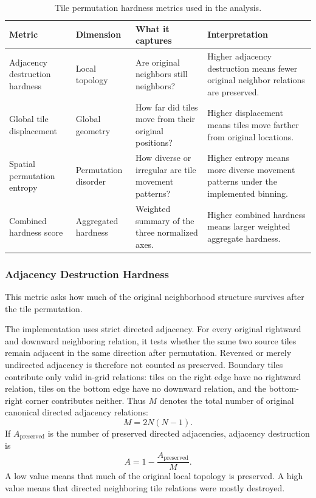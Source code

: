 \documentclass[12pt]{article}
\newcommand{\reporttablesize}{\small}
\begin{document}
\begin{table}[t]
  \centering
  \reporttablesize
  \renewcommand{\arraystretch}{1.12}
  \begin{tabularx}{\textwidth}{>{\raggedright\arraybackslash}p{}>{\raggedright\arraybackslash}p{}>{\raggedright\arraybackslash}p{}>{\raggedright\arraybackslash}X}
    \toprule
    \textbf{Metric} & \textbf{Dimension} & \textbf{What it captures} & \textbf{Interpretation} \\
    \midrule
    Adjacency destruction hardness & Local topology & Are original neighbors still neighbors? & Higher adjacency destruction means fewer original neighbor relations are preserved. \\
    Global tile displacement & Global geometry & How far did tiles move from their original positions? & Higher displacement means tiles move farther from original locations. \\
    Spatial permutation entropy & Permutation disorder & How diverse or irregular are tile movement patterns? & Higher entropy means more diverse movement patterns under the implemented binning. \\
    Combined hardness score & Aggregated hardness & Weighted summary of the three normalized axes. & Higher combined hardness means larger weighted aggregate hardness. \\
    \bottomrule
  \end{tabularx}
  \caption{Tile permutation hardness metrics used in the analysis.}
  \label{tab:tile-permutation-hardness-metrics}
\end{table}

\subsubsection{Adjacency Destruction Hardness}

This metric asks how much of the original neighborhood structure survives after the tile permutation.

The implementation uses strict directed adjacency. For every original rightward and downward neighboring relation, it tests whether the same two source tiles remain adjacent in the same direction after permutation. Reversed or merely undirected adjacency is therefore not counted as preserved. Boundary tiles contribute only valid in-grid relations: tiles on the right edge have no rightward relation, tiles on the bottom edge have no downward relation, and the bottom-right corner contributes neither. Thus $M$ denotes the total number of original canonical directed adjacency relations:
\[
M = 2N(N - 1).
\]
If $A_{\mathrm{preserved}}$ is the number of preserved directed adjacencies, adjacency destruction is
\[
A = 1 - \frac{A_{\mathrm{preserved}}}{M}.
\]
A low value means that much of the original local topology is preserved. A high value means that directed neighboring tile relations were mostly destroyed.
\end{document}
